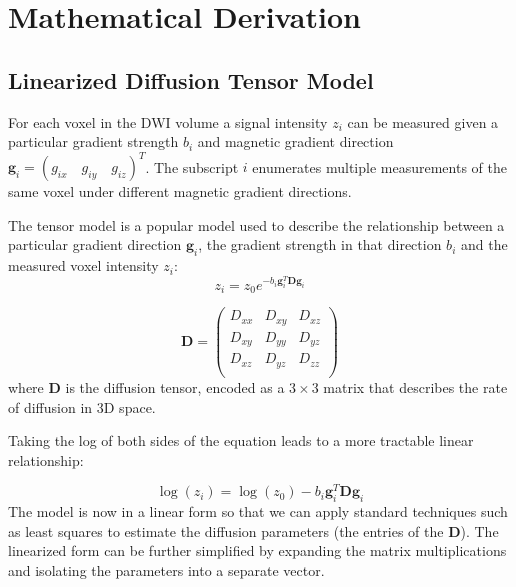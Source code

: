 \section{Mathematical Derivation}
\subsection{Linearized Diffusion Tensor Model}
For each voxel in the DWI volume a signal intensity $z_i$ can be measured given a particular gradient strength $b_i$ and magnetic gradient direction $\mathbf{g}_{i}=(g_{ix} \quad g_{iy} \quad g_{iz})^T$.  The subscript $i$ enumerates multiple measurements of the same voxel under different magnetic gradient directions.

The tensor model is a popular model used to describe the relationship between a particular gradient direction $\mathbf{g}_i$, the gradient strength in that direction $b_i$ and the measured voxel intensity $z_i$:  
%
%
\begin{equation} \label{eq:tensormodel}
z_{i}=z_0 e^{-b_i \mathbf{g}_i^T \mathbf{D} \mathbf{g}_i}
\end{equation}


\begin{equation} \label{eq:Dtensor}
\mathbf{D}=
\left( \begin{array}{ccc}
D_{xx} & D_{xy} & D_{xz} \\
D_{xy} & D_{yy} & D_{yz} \\
D_{xz} & D_{yz} & D_{zz} \\
\end{array} \right)
\end{equation}
%
%
where $\mathbf{D}$ is the diffusion tensor, encoded as a $3\times3$ matrix that describes the rate of diffusion in 3D space.  


Taking the log of both sides of the equation leads to a more tractable linear relationship:

\begin{equation} \label{eq:logtensormodel}
\log(z_i)=\log(z_0)-b_i \mathbf{g}_i^T \mathbf{D} \mathbf{g}_i
\end{equation}
%
%
The model is now in a linear form so that we can apply standard techniques such as least squares to estimate the diffusion parameters (the entries of the $\mathbf{D}$).  The linearized form can be further simplified by expanding the matrix multiplications and isolating the parameters into a separate vector.

